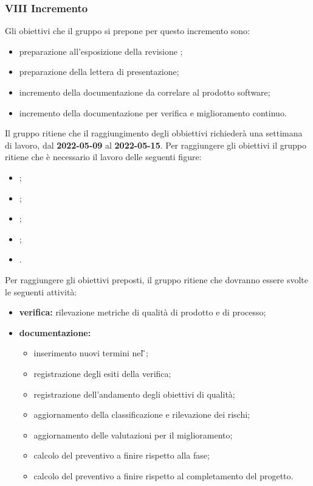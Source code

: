 \subsubsection{VIII Incremento}
Gli obiettivi che il gruppo si prepone per questo incremento sono:
\begin{itemize}
	\item preparazione all’esposizione della revisione \PB{};
  	\item preparazione della lettera di presentazione;
 	\item incremento della documentazione da correlare al prodotto software;
	\item incremento della documentazione per verifica e miglioramento continuo.
\end{itemize}
Il gruppo ritiene che il raggiungimento degli obbiettivi richiederà una settimana di lavoro, dal \textbf{2022-05-09} al \textbf{2022-05-15}.
Per raggiungere gli obiettivi il gruppo ritiene che è necessario il lavoro delle seguenti figure:
\begin{itemize}
	\item \RE{};
 	\item \AM{};
   	\item \PT{};
    \item \PR{};
   	\item \VE{}.
\end{itemize}
Per raggiungere gli obiettivi preposti, il gruppo ritiene che dovranno essere svolte le seguenti attività:
\begin{itemize}
 	\item \textbf{verifica:} rilevazione metriche di qualità di prodotto e di processo;
	\item \textbf{documentazione:} 
	 \begin{itemize}
		\item inserimento nuovi termini nel \G{};
  		\item registrazione degli esiti della verifica;
     	\item registrazione dell’andamento degli obiettivi di qualità;
      	\item aggiornamento della classificazione e rilevazione dei rischi;
		\item aggiornamento delle valutazioni per il miglioramento; 
		\item calcolo del preventivo a finire rispetto alla fase;
		\item calcolo del preventivo a finire rispetto al completamento del progetto.
	 \end{itemize}
\end{itemize}
